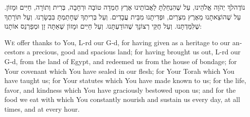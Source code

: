 \documentclass[a5paper, 12pt]{book}
\begin{document}
\eject

\lettrine[lines=2, depth=1, findent=1.5em]{נוֹדֶה}לְךָ יְהֹוָה אֱלֹהֵינוּ, עַל שֶׁהִנְחַלְתָּ לַאֲבוֹתֵינוּ אֶרֶץ חֶמְדָה טוֹבָה וּרְחָבָה, בְּרִית וְתוֹרָה, חַיִּים וּמָזוֹן. עַל שֶׁהוֹצֵאתָנוּ מֵאֶרֶץ מִצְרַיִם, וּפְדִיתָנוּ מִבֵּית עֲבָדִים. וְעַל בְּרִיתְךָ שֶׁחָתַמְתָּ בִּבְשָׂרֵנוּ. וְעַל תּוֹרָתְךָ שֶׁלִּמַּדְתָּנוּ. וְעַל חֻקֵּי רְצוֹנָךְ שֶׁהוֹדַעְתָּנוּ. וְעַל חַיִּים וּמָזוֹן שֶׁאַתָּה זָן וּמְפַרְנֵס אוֹתָנוּ:

\begin{english}

\lettrine{W}e offer thanks to You, L-rd our G‑d, for having given as a heritage to our ancestors a precious, good and spacious land; for having brought us out, L-rd our G‑d, from the land of Egypt, and redeemed us from the house of bondage; for Your covenant which You have sealed in our flesh; for Your Torah which You have taught us; for Your statutes which You have made known to us; for the life, favor, and kindness which You have graciously bestowed upon us; and for the food we eat with which You constantly nourish and sustain us every day, at all times, and at every hour.

\end{english}
\end{document}
